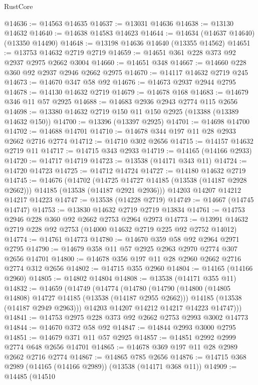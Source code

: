 \begin{lexlean}{RustCore}
\begin{coremodule}
@14636 := @14563 @14635
@14637 := @13031 @14636
@14638 := @13130 @14632
@14640 := @14638 @14583 @14623
@14644 := @14634 (@14637 @14640) (@13350 @14490)
@14648 := @13198 @14636 @14640 (@13355 @14562)
@14651 := @13753 @14632 @2719 @2719
@14659 := @14651 @361 @228 @373 @92 @2937 @2975 @2662 @3004
@14660 := @14651 @348
@14667 := @14660 @228 @360 @92 @2937 @2946 @2662 @2975
@14670 := @14117 @14632 @2719 @245
@14673 := @14670 @347 @58 @92
@14676 := @14673 @2937 @2944 @2795
@14678 := @14130 @14632 @2719
@14679 := @14678 @168
@14683 := @14679 @346 @11 @57 @2925
@14688 := @14683 @2936 @2943 @2774 @115 @2656
@14698 := @13380 @14632 @2719 @150 @11 @150 @2925 (@13388 (@13389 @14632 @150))
@14700 := @13396 (@13397 @2925)
@14701 := @14698 @14700
@14702 := @14688 @14701
@14710 := @14678 @344 @197 @11 @28 @2933 @2662 @2716 @2774
@14712 := @14710 @302 @2656
@14715 := @14157 @14632 @2719 @11
@14717 := @14715 @343 @2933
@14719 := @14165 (@14166 @2933)
@14720 := @14717 @14719
@14723 := @13538 (@14171 @343 @11)
@14724 := @14720 @14723
@14725 := @14712 @14724
@14727 := @14180 @14632 @2719
@14745 := @14676
    (@14702
      (@14725 @14727 @14185 (@13538 (@14187 @2928 @2662)))
      @14185
      (@13538 (@14187 @2921 @2936)))
    @14203
    @14207
    @14212
    @14217
    @14223
@14747 := @13538 (@14228 @2719)
@14749 := @14667 (@14745 @14747)
@14753 := @13830 @14632 @2719 @2719 @13834
@14761 := @14753 @2946 @228 @360 @92 @2662 @2753 @2964 @2973
@14773 := @13991 @14632 @2719 @228 @92 @2753 (@14000 @14632 @2719 @225 @92 @2752 @14012)
@14774 := @14761 @14773
@14780 := @14670 @359 @58 @92 @2964 @2971 @2795
@14790 := @14679 @358 @11 @57 @2925 @2963 @2970 @2774 @307 @2656 @14701
@14800 := @14678 @356 @197 @11 @28 @2960 @2662 @2716 @2774 @312 @2656
@14802 := @14715 @355 @2960
@14804 := @14165 (@14166 @2960)
@14805 := @14802 @14804
@14808 := @13538 (@14171 @355 @11)
@14832 := @14659
    (@14749
      (@14774
        (@14780
          (@14790
            (@14800 (@14805 @14808) @14727 @14185 (@13538 (@14187 @2955 @2662)))
            @14185
            (@13538 (@14187 @2949 @2963)))
          @14203
          @14207
          @14212
          @14217
          @14223
          @14747)))
@14841 := @14753 @2975 @228 @373 @92 @2662 @2753 @2993 @3002 @14773
@14844 := @14670 @372 @58 @92
@14847 := @14844 @2993 @3000 @2795
@14851 := @14679 @371 @11 @57 @2925
@14857 := @14851 @2992 @2999 @2774 @648 @2656 @14701
@14865 := @14678 @369 @197 @11 @28 @2989 @2662 @2716 @2774
@14867 := @14865 @785 @2656
@14876 := @14715 @368 @2989 (@14165 (@14166 @2989)) (@13538 (@14171 @368 @11))
@14909 := @14485
    (@14510

\end{coremodule}
\end{lexlean}
